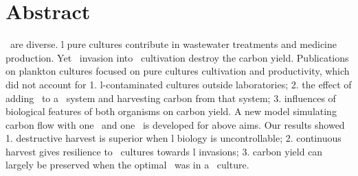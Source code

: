 \documentclass[../thesis.tex]{subfiles} %
\begin{document}
\section{Abstract}
\Bac\ are diverse.  \Bac l pure cultures contribute in wastewater treatments and medicine production.  Yet \bac\ invasion into \phy\ cultivation destroy the carbon yield.  Publications on plankton cultures focused on pure cultures cultivation and productivity, which did not account for 1. \bac l-contaminated cultures outside laboratories; 2. the effect of adding \bac\ to a \phy\ system and harvesting carbon from that system; 3. influences of biological features of both organisms on carbon yield.  A new model simulating carbon flow with one \phy\ and one \bac\ is developed for above aims.  Our results showed 1. destructive harvest is superior when \bac l biology is uncontrollable; 2. continuous harvest gives resilience to \phy\ cultures towards \bac l invasions; 3. carbon yield can largely be preserved when the optimal \bac\ was in a \phy\ culture.
\end{document}
